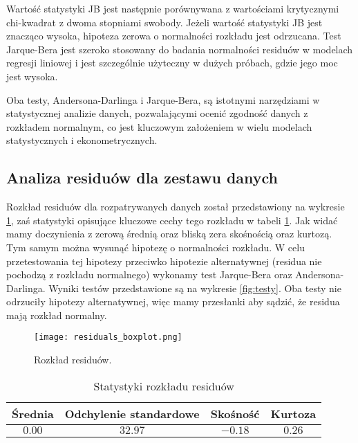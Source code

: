 \documentclass{article}
\begin{document}
Wartość statystyki JB jest następnie porównywana z wartościami krytycznymi chi-kwadrat z dwoma stopniami swobody. Jeżeli wartość statystyki JB jest znacząco wysoka, hipoteza zerowa o normalności rozkładu jest odrzucana. Test Jarque-Bera jest szeroko stosowany do badania normalności residuów w modelach regresji liniowej i jest szczególnie użyteczny w dużych próbach, gdzie jego moc jest wysoka.

Oba testy, Andersona-Darlinga i Jarque-Bera, są istotnymi narzędziami w statystycznej analizie danych, pozwalającymi ocenić zgodność danych z rozkładem normalnym, co jest kluczowym założeniem w wielu modelach statystycznych i ekonometrycznych.


\subsection{Analiza residuów dla zestawu danych}
Rozkład residuów dla rozpatrywanych danych został przedstawiony na wykresie \ref{fig:residuaboxplot}, zaś statystyki opisujące kluczowe cechy tego rozkładu w tabeli \ref{tab:residuastatystyki}.  Jak widać mamy doczynienia z zerową średnią oraz bliską zera skośnością oraz kurtozą. Tym samym można wysunąć hipotezę o normalności rozkładu. W celu przetestowania tej hipotezy przeciwko hipotezie alternatywnej (residua nie pochodzą z rozkładu normalnego) wykonamy test Jarque-Bera oraz Andersona-Darlinga. Wyniki testów przedstawione są na wykresie \ref{fig:testy}. Oba testy nie odrzuciły hipotezy alternatywnej, więc mamy przesłanki aby sądzić, że residua mają rozkład normalny.


 
\begin{figure}[!h]
  \centering
  \texttt{[image: residuals\_boxplot.png]}
  \caption{Rozkład residuów.}
  \label{fig:residuaboxplot}
\end{figure}

\begin{table}[htb]
  \centering
  \begin{tabular}{|cccc|}
    \toprule
    \textbf{Średnia} & \textbf{Odchylenie standardowe} & \textbf{Skośność} & \textbf{Kurtoza} \\
    \midrule
     $0.00$ & $32.97$ & $-0.18$ & $0.26$ \\
    \bottomrule
  \end{tabular}
  \caption{Statystyki rozkładu residuów}
  \label{tab:residuastatystyki}
\end{table}
\end{document}
